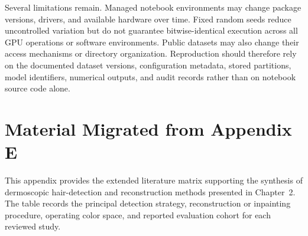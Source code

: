 Several limitations remain. Managed notebook environments may change package versions, drivers, and available hardware over time. Fixed random seeds reduce uncontrolled variation but do not guarantee bitwise-identical execution across all GPU operations or software environments. Public datasets may also change their access mechanisms or directory organization. Reproduction should therefore rely on the documented dataset versions, configuration metadata, stored partitions, model identifiers, numerical outputs, and audit records rather than on notebook source code alone.


\section{Material Migrated from Appendix E}


This appendix provides the extended literature matrix supporting the synthesis of dermoscopic hair-detection and reconstruction methods presented in Chapter~2. The table records the principal detection strategy, reconstruction or inpainting procedure, operating color space, and reported evaluation cohort for each reviewed study.




